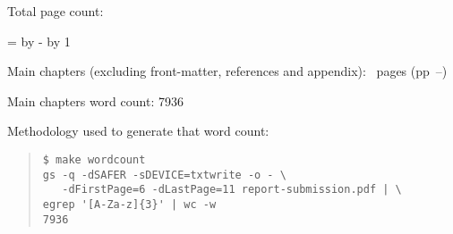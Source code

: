 \ifsubmission

\begin{defaultsffamily} %
Total page count: \pageref{LastPage}

\makeatletter
\@tempcnta=\relax%
\advance\@tempcnta by -%
\advance\@tempcnta by 1%
\xdef\contentpages{\the\@tempcnta}%
\makeatother

Main chapters (excluding front-matter, references and appendix):
\contentpages~pages
(pp~\pageref{firstcontentpage}--\pageref{lastcontentpage})

Main chapters word count: 7936

\vspace*{1em}
Methodology used to generate that word count:

\begin{quote}
\begin{verbatim}
$ make wordcount
gs -q -dSAFER -sDEVICE=txtwrite -o - \
   -dFirstPage=6 -dLastPage=11 report-submission.pdf | \
egrep '[A-Za-z]{3}' | wc -w
7936
\end{verbatim}
\end{quote}

\end{defaultsffamily}
\vspace{\fill}
\onehalfspacing






\else

